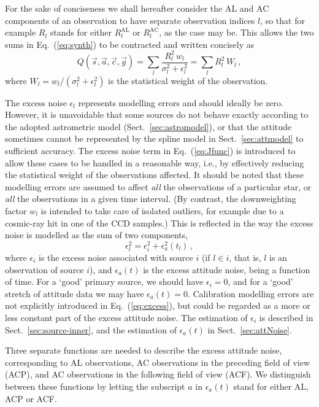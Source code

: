 \documentclass[structabstract]{aa}
\begin{document}
For the sake of conciseness we shall hereafter consider the AL and AC components
of an observation to have separate observation indices $l$, so that for example
$R_l$ stands for either $R_l^\text{AL}$ or $R_l^\text{AC}$, as the case may be. 
This allows the two sums in Eq.~(\ref{eq:synth}) to be
contracted and written concisely as
\begin{equation}\label{eq:Jfunc}
Q(\vec{s},\vec{a},\vec{c},\vec{g}) =
\sum_{l} \frac{R_l^2\,w_l}{\sigma_l^2+\epsilon_l^2} =
\sum_{l} R_l^2\,W_l\, ,
\end{equation}
where $W_l=w_l/(\sigma_l^2+\epsilon_l^2)$ is the statistical weight of the 
observation.

The excess noise $\epsilon_l$ represents modelling errors and should ideally
be zero. However, it is unavoidable that some sources do not behave exactly 
according to the adopted astrometric model (Sect.~\ref{sec:astromodel}), or
that the attitude sometimes cannot be represented by the spline model in 
Sect.~\ref{sec:attmodel} to sufficient accuracy. The excess noise term
in Eq.~(\ref{eq:Jfunc}) is introduced to allow these cases to be handled in a 
reasonable way, i.e., by effectively reducing the statistical weight of the
observations affected. It should be noted that these modelling errors are
assumed to affect \emph{all} the observations of a particular star, or
\emph{all} the observations in a given time interval. (By contrast, the 
downweighting factor $w_l$ is intended to take care of isolated outliers,
for example due to a cosmic-ray hit in one of the CCD samples.) This
is reflected in the way the excess noise is modelled as the sum of two
components,
\begin{equation}\label{eq:excess}
\epsilon_l^2 = \epsilon_i^2 + \epsilon^2_a(t_l) \, ,
\end{equation}
where $\epsilon_i$ is the excess noise associated with source $i$ (if
$l\in i$, that is, $l$ is an observation of source $i$), and $\epsilon_a(t)$ 
is the excess 
attitude noise, being a function of time. For a `good' primary source, we 
should have $\epsilon_i=0$, and for a `good' stretch of attitude data 
we may have $\epsilon_a(t)=0$.  Calibration modelling errors are not 
explicitly introduced in Eq.~(\ref{eq:excess}), but could be regarded as 
a more or less constant 
part of the excess attitude noise. The estimation of $\epsilon_i$
is described in Sect.~\ref{sec:source-inner}, and the estimation of 
$\epsilon_a(t)$ in Sect.~\ref{sec:attNoise}.

Three separate functions are needed to describe the excess attitude 
noise, corresponding to AL observations, AC observations in the
preceding field of view (ACP), and AC observations in the following field
of view (ACF).
We distinguish between these functions by letting the subscript $a$ in
$\epsilon_a(t)$ stand for either AL, ACP or ACF.
\end{document}
